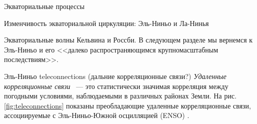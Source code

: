 \begin{chapter}{Экваториальные процессы}
\begin{section}{Изменчивость экваториальной циркуляции: Эль-Ниньо и Ла-Нинья}
\begin{paragraph}{Экваториальные волны Кельвина и Россби.}
В следующем разделе мы вернемся к Эль-Ниньо и его <<далеко 
распространяющимся крупномасштабным последствиям>>.
%
\end{paragraph}
\end{section}

\begin{section}{Эль-Ниньо teleconnections (дальние корреляционные связи?)}
\emph{Удаленные корреляционные связи}%
%
%
~--- это статистически значимая корреляция между погодными условиями, 
наблюдаемыми в различных районах Земли. На рис.\ref{fig:teleconnections} 
показаны преобладающие удаленные корреляционные связи, ассоциируемые 
с Эль-Ниньо-Южной осцилляцией (ENSO)%
.
%


\end{section}
\end{chapter}
